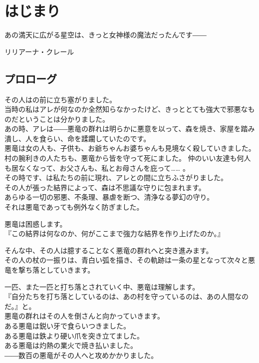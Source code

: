 \documentclass[oneside, a4paper]{jsbook}
\begin{document}
\chapter{はじまり}
\epigraph{あの満天に広がる星空は、きっと女神様の魔法だったんです――}{リリアーナ・クレール}

\section{プロローグ}

その人はの前に立ち塞がりました。\\

当時の私はアレが何なのか全然知らなかったけど、きっととても強大で邪悪なものだということは分かりました。\\
あの時、アレは――悪竜の群れは明らかに悪意を以って、森を焼き、家屋を踏み潰し、人を食らい、命を蹂躙していたのです。\\
悪竜は女の人も、子供も、お爺ちゃんお婆ちゃんも見境なく殺していきました。
村の腕利きの人たちも、悪竜から皆を守って死にました。
仲のいい友達も何人も居なくなって、お父さんも、私とお母さんを庇って…… 。\\


その時です、は私たちの前に現れ、アレとの間に立ちふさがりました。\\
その人が張った結界によって、森は不思議な守りに包まれます。\\
あらゆる一切の邪悪、不条理、暴虐を断つ、清浄なる夢幻の守り。\\
それは悪竜であっても例外なく防ぎました。

悪竜は困惑します。\\
『この結界は何なのか、何がここまで強力な結界を作り上げたのか。』

そんな中、その人は臆することなく悪竜の群れへと突き進みます。\\
その人の杖の一振りは、青白い弧を描き、その軌跡は一条の星となって次々と悪竜を撃ち落としていきます。

一匹、また一匹と打ち落とされていく中、悪竜は理解します。\\
『自分たちを打ち落としているのは、あの村を守っているのは、あの人間なのだ。』と。\\


悪竜の群れはその人を倒さんと向かっていきます。\\
ある悪竜は鋭い牙で食らいつきました。\\
ある悪竜は鉄より硬い爪を突き立てました。\\
ある悪竜は灼熱の業火で焼き払いました。\\
――数百の悪竜がその人へと攻めかかりました。\\
\end{document}

